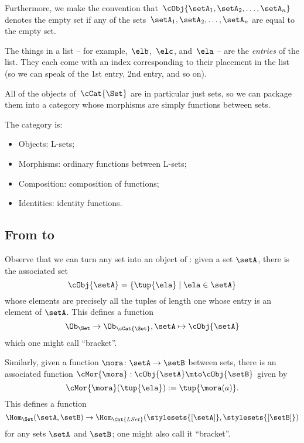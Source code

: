 Furthermore, we make the convention that~$\cObj{\setA_1, \setA_2, \dots, \setA_n}$ denotes the empty set if any of the sets~$\setA_1, \setA_2, \dots , \setA_n$ are equal to the empty set.

The things in a list -- for example,~$\elb$,~$\elc$, and~$\ela$ -- are the \emph{entries} of the list.
They each come with an index corresponding to their placement in the list (so we can speak of the 1st entry, 2nd entry, and so on).

All of the objects of~$\cCat{\Set}$ are in particular just sets, so we can package them into a category whose morphisms are simply functions between sets.

\begin{ctdefinition}[\cCat{\Set}]
    The category \cCat{\Set} is:

    \begin{itemize}
        \item Objects: L-sets;
        \item Morphisms: ordinary functions between L-sets;
        \item Composition: composition of functions;
        \item Identities: identity functions.
    \end{itemize}
\end{ctdefinition}

\subsection{From \Set to \cCat{\Set}}

Observe that we can turn any set into an object of \cCat{\Set}: given a set $\setA$, there is the associated set
\begin{equation}
    \cObj{\setA} = \{ \tup{\ela} \mid \ela \in \setA \}
\end{equation}
whose elements are precisely all the tuples of length one whose entry is an element of $\setA$.
This defines a function
\begin{equation}
    \Ob_{\Set} \to \Ob_{\cCat{\Set}}, \setA \mapsto \cObj{\setA}
\end{equation}
which one might call ``bracket''.

Similarly, given a function $\mora \colon \setA \to \setB$ between sets, there is an associated function $\cMor{ \mora }: \cObj{\setA} \mto \cObj{\setB}$ given by
\begin{equation}
    \cMor{ \mora } ( \tup{ \ela }) := \tup{\mora(a)}.
\end{equation}
This defines a function
\begin{equation}
    \Hom_{\Set}(\setA,\setB) \to \Hom_{\Cat{LSet}}(\stylesets{[\setA]},\stylesets{[\setB]})
\end{equation}
for any sets $\setA$ and $\setB$; one might also call it ``bracket''.

